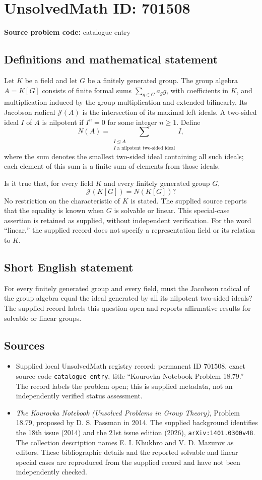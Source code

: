\documentclass[11pt]{article}
\begin{document}
\section*{UnsolvedMath ID: 701508}
\textbf{Source problem code:} catalogue entry
\subsection{Definitions and mathematical statement}
Let \(K\) be a field and let \(G\) be a finitely generated group. The group algebra \(A=K[G]\) consists of finite formal sums \(\sum_{g\in G}a_g g\), with coefficients in \(K\), and multiplication induced by the group multiplication and extended bilinearly. Its Jacobson radical \(\mathcal J(A)\) is the intersection of its maximal left ideals. A two-sided ideal \(I\) of \(A\) is nilpotent if \(I^n=0\) for some integer \(n\geq 1\). Define
\[
N(A)=\sum_{\substack{I\trianglelefteq A\\ I\text{ a nilpotent two-sided ideal}}} I,
\]
where the sum denotes the smallest two-sided ideal containing all such ideals; each element of this sum is a finite sum of elements from those ideals.

Is it true that, for every field \(K\) and every finitely generated group \(G\),
\[
\mathcal J(K[G])=N(K[G])?
\]
No restriction on the characteristic of \(K\) is stated. The supplied source reports that the equality is known when \(G\) is solvable or linear. This special-case assertion is retained as supplied, without independent verification. For the word ``linear,'' the supplied record does not specify a representation field or its relation to \(K\).
\subsection{Short English statement}
For every finitely generated group and every field, must the Jacobson radical of the group algebra equal the ideal generated by all its nilpotent two-sided ideals? The supplied record labels this question open and reports affirmative results for solvable or linear groups.
\subsection{Sources}
\begin{itemize}
\item Supplied local UnsolvedMath registry record: permanent ID \(701508\), exact source code \texttt{catalogue entry}, title ``Kourovka Notebook Problem 18.79.'' The record labels the problem open; this is supplied metadata, not an independently verified status assessment.
\item \emph{The Kourovka Notebook (Unsolved Problems in Group Theory)}, Problem 18.79, proposed by D. S. Passman in 2014. The supplied background identifies the 18th issue (2014) and the 21st issue edition (2026), \texttt{arXiv:1401.0300v48}. The collection description names E. I. Khukhro and V. D. Mazurov as editors. These bibliographic details and the reported solvable and linear special cases are reproduced from the supplied record and have not been independently checked.
\end{itemize}
\end{document}
